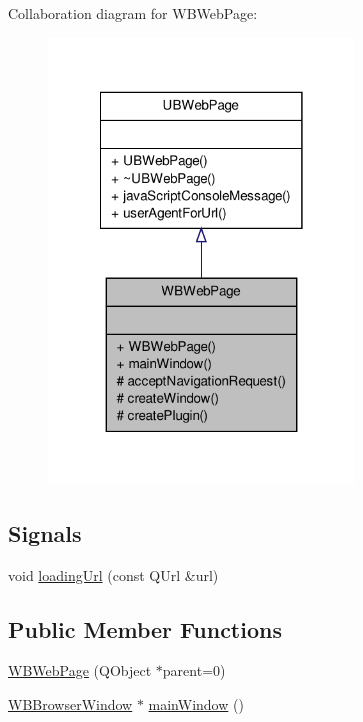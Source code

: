 Collaboration diagram for W\-B\-Web\-Page\-:
\nopagebreak
\begin{figure}[H]
\begin{center}
\leavevmode
\includegraphics[width=230pt]{d4/d3a/class_w_b_web_page__coll__graph}
\end{center}
\end{figure}
\subsection*{Signals}
\begin{DoxyCompactItemize}
\item 
void \hyperlink{class_w_b_web_page_a86b8a9a816d7760c268596f9c98cf286}{loading\-Url} (const Q\-Url \&url)
\end{DoxyCompactItemize}
\subsection*{Public Member Functions}
\begin{DoxyCompactItemize}
\item 
\hyperlink{class_w_b_web_page_a01017231eb0981875b79223f8457b302}{W\-B\-Web\-Page} (Q\-Object $\ast$parent=0)
\item 
\hyperlink{class_w_b_browser_window}{W\-B\-Browser\-Window} $\ast$ \hyperlink{class_w_b_web_page_a1fac1279159f6576bd31cf60a38f8141}{main\-Window} ()
\end{DoxyCompactItemize}
